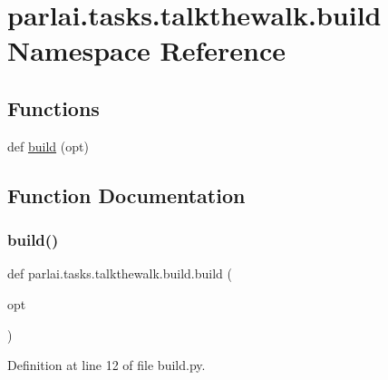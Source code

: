 \hypertarget{namespaceparlai_1_1tasks_1_1talkthewalk_1_1build}{}\section{parlai.\+tasks.\+talkthewalk.\+build Namespace Reference}
\label{namespaceparlai_1_1tasks_1_1talkthewalk_1_1build}
\subsection*{Functions}
\begin{DoxyCompactItemize}
\item 
def \hyperlink{namespaceparlai_1_1tasks_1_1talkthewalk_1_1build_ad51286ba43b5d307706a281240d1aa7b}{build} (opt)
\end{DoxyCompactItemize}


\subsection{Function Documentation}
\mbox{\label{namespaceparlai_1_1tasks_1_1talkthewalk_1_1build_ad51286ba43b5d307706a281240d1aa7b}} 
\subsubsection{\texorpdfstring{build()}{build()}}
{\footnotesize\ttfamily def parlai.\+tasks.\+talkthewalk.\+build.\+build (\begin{DoxyParamCaption}\item[{}]{opt }\end{DoxyParamCaption})}



Definition at line 12 of file build.\+py.

